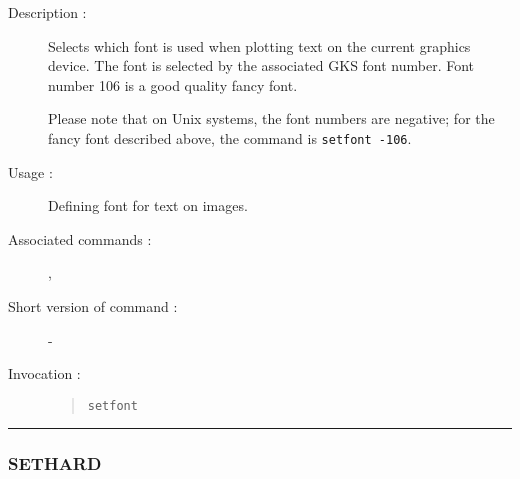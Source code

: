 \begin{description}

\item[Description :] Selects which font is used when plotting text on
the current graphics device.  The font is selected by the associated
GKS font number.  Font number 106 is a good quality fancy font.

Please note that on Unix systems, the font numbers are negative; for the
fancy font described above, the command is {\tt setfont -106}.

\item[Usage :] Defining font for text on images.

\item[Associated commands :] {\tt {}}, 
{\tt {}}

\item[Short version of command :] -
\item[Invocation :]

\begin{quote}{\tt  setfont }\end{quote}

\end{description}

\hrule 
\subsubsection*{\label{SETHARD}SETHARD}

